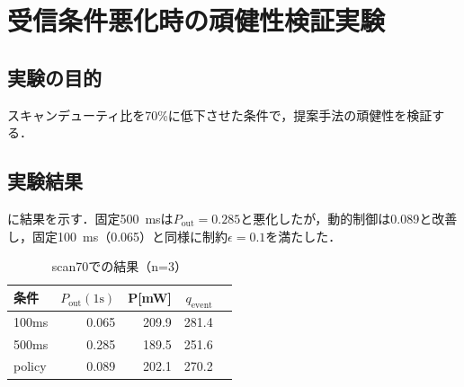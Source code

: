 \section{受信条件悪化時の頑健性検証実験}
\label{sec:exp_scan70}

\subsection{実験の目的}

スキャンデューティ比を70\%に低下させた条件で，提案手法の頑健性を検証する．

\subsection{実験結果}

に結果を示す．固定\SI{500}{\milli\second}は$P_{\mathrm{out}}=0.285$と悪化したが，動的制御は0.089と改善し，固定\SI{100}{\milli\second}（0.065）と同様に制約$\epsilon=0.1$を満たした．

\begin{table}[tb]
  \centering
  \caption{scan70での結果（n=3）}
  \begin{tabular}{lrrrr}
    \toprule
    条件 & $P_{\mathrm{out}}(1\mathrm{s})$ & P[mW] & $q_{\mathrm{event}}$ \\
    \midrule
    100ms & 0.065 & 209.9 & 281.4 \\
    500ms & 0.285 & 189.5 & 251.6 \\
    policy & 0.089 & 202.1 & 270.2 \\
    \bottomrule
  \end{tabular}
\end{table}

\clearpage
